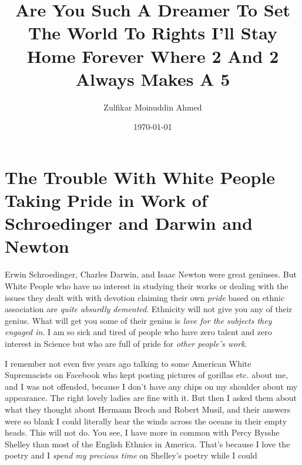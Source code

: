 \documentclass{amsart}
\title{Are You Such A Dreamer To Set The World To Rights I'll Stay Home Forever Where 2 And 2 Always Makes A 5}
\author{Zulfikar Moinuddin Ahmed}
\date{\today}
\begin{document}
\maketitle

\section{The Trouble With White People Taking Pride in Work of Schroedinger and Darwin and Newton}

Erwin Schroedinger, Charles Darwin, and Isaac Newton were great geniuses.  But White People who have no interest in studying their works or dealing with the issues they dealt with with devotion claiming their own {\em pride} based on ethnic association are {\em quite absurdly demented}.  Ethnicity will not give you any of their genius.  What will get you some of their genius is {\em love for the subjects they engaged in}.  I am so sick and tired of people who have zero talent and zero interest in Science but who are full of pride for {\em other people's work}.  

I remember not even five years ago talking to some American White Supremacists on Facebook who kept posting pictures of gorillas etc. about me, and I was not offended, because I don't have any chips on my shoulder about my appearance.  The right lovely ladies are fine with it.  But then I asked them about what they thought about Hermann Broch and Robert Musil, and their answers were so blank I could literally hear the winds across the oceans in their empty heads.  This will not do.  You see, I have more in common with Percy Bysshe Shelley than most of the English Ethnics in America.  That's because I love the poetry and I {\em spend my precious time} on Shelley's poetry while I could 
\end{document}
